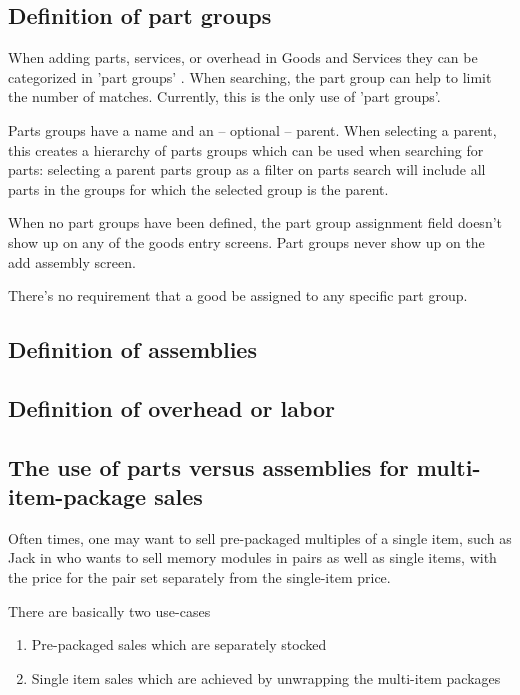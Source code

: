 \subsection{Definition of part groups}
\label{subsec-parts-groups}

When adding parts, services, or overhead in Goods and Services they can be categorized in 'part groups' .
When searching, the part group can help to limit the number of matches.  Currently, this is the only use of 'part groups'.

Parts groups have a name and an -- optional -- parent. When
selecting a parent, this creates a hierarchy of parts groups which
can be used when searching for parts: selecting a parent parts
group as a filter on parts search will include all parts in the 
groups for which the selected group is the parent.

When no part groups have been defined, the part group assignment field doesn't
show up on any of the goods entry screens. Part groups never show up on the add assembly screen.

There's no requirement that a good be assigned to any specific part group.

\subsection{Definition of assemblies}
\label{subsec-assemblies-definition}


\subsection{Definition of overhead or labor}
\label{subsec-overhead-definition}

\subsection{The use of parts versus assemblies for multi-item-package sales}
\label{subsec-parts-versus-assemblies}

Often times, one may want to sell pre-packaged multiples of a single item, such as Jack
in  who wants to sell memory modules in pairs as well as
single items, with the price for the pair set separately from the single-item price.

There are basically two use-cases

\begin{enumerate}
\item Pre-packaged sales which are separately stocked
\item Single item sales which are achieved by unwrapping the multi-item packages
\end{enumerate}

